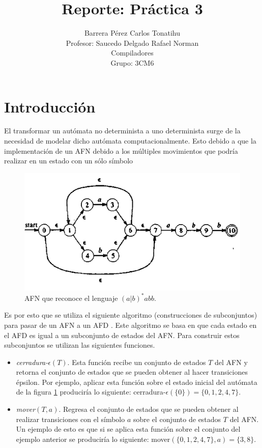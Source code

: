 \documentclass[titlepage]{article}
\title{Reporte: Práctica 3}
\author{Barrera Pérez Carlos Tonatihu \\ Profesor: Saucedo Delgado Rafael Norman \\ Compiladores \\ Grupo: 3CM6 }
\begin{document}
\maketitle
\tableofcontents
\newpage
\section{Introducción}
El transformar un autómata no determinista a uno determinista surge de la necesidad de modelar dicho autómata computacionalmente. Esto debido a que la implementación de un AFN debido a los múltiples movimientos que podría realizar en un estado con un sólo símbolo
\begin{figure}[H]
        \begin{center}
        \includegraphics[width=12cm]{AFN.png}
        \caption{AFN que reconoce el lenguaje $(a|b)^{*}abb$.}
        \label{fig:AFN}
        \end{center}
    \end{figure}
Es por esto que se utiliza el siguiente algoritmo (construcciones de subconjuntos) para pasar de un AFN a un AFD \cite{compis}. Este algoritmo se basa en que cada estado en el AFD es igual a un subconjunto de estados del AFN. Para construir estos subconjuntos se utilizan las siguientes funciones.
\begin{itemize}
	\item \emph{cerradura-$\epsilon(T)$}. Esta función recibe un conjunto de estados $T$ del AFN y retorna el conjunto de estados que se pueden obtener al hacer transiciones épsilon. Por ejemplo, aplicar esta función sobre el estado inicial del autómata de la figura \ref{fig:AFN} produciría lo siguiente: cerradura-$\epsilon(\{0\}) = \{0, 1, 2, 4, 7\}$.
	
	\item \emph{mover$(T, a)$}. Regresa el conjunto de estados que se pueden obtener al realizar transiciones con el símbolo $a$ sobre el conjunto de estados $T$ del AFN. Un ejemplo de esto es que si se aplica esta función sobre el conjunto del ejemplo anterior se produciría lo siguiente: mover$(\{0, 1, 2, 4, 7\}, a) = \{3, 8\}$.
\end{itemize}
\end{document}
